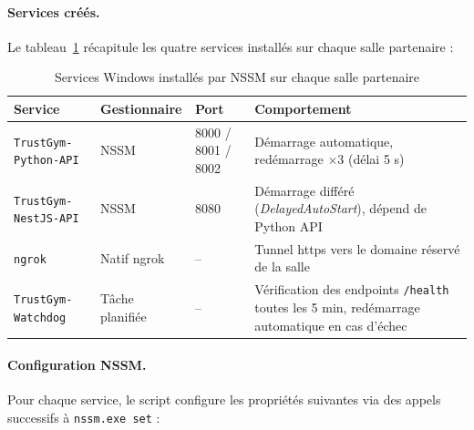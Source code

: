 ﻿\documentclass[../main.tex]{subfiles}
\begin{document}
\paragraph{Services cr\'{e}\'{e}s.}
Le tableau~\ref{tab:nssm_services} r\'{e}capitule les quatre services install\'{e}s sur chaque salle partenaire :

\begin{table}[H]
\centering
\small
\begin{tabular}{|p{4.5cm}|p{2cm}|p{2.5cm}|p{4.5cm}|}
\hline
\textbf{Service} & \textbf{Gestionnaire} & \textbf{Port} & \textbf{Comportement} \\
\hline
\texttt{TrustGym-Python-API} & NSSM & 8000 / 8001 / 8002 & D\'{e}marrage automatique, redémarrage $\times$3 (d\'{e}lai 5 s) \\
\hline
\texttt{TrustGym-NestJS-API} & NSSM & 8080 & D\'{e}marrage diff\'{e}r\'{e} (\textit{DelayedAutoStart}), d\'{e}pend de Python API \\
\hline
\texttt{ngrok} & Natif ngrok & -- & Tunnel \acrshort{https} vers le domaine r\'{e}serv\'{e} de la salle \\
\hline
\texttt{TrustGym-Watchdog} & T\^{a}che planifi\'{e}e & -- & V\'{e}rification des endpoints \texttt{/health} toutes les 5 min, red\'{e}marrage automatique en cas d'\'{e}chec \\
\hline
\end{tabular}
\caption{Services Windows install\'{e}s par NSSM sur chaque salle partenaire}
\label{tab:nssm_services}
\end{table}

\paragraph{Configuration NSSM.}
\begin{sloppypar}
Pour chaque service, le script configure les propri\'{e}t\'{e}s suivantes via des appels successifs \`{a} \texttt{nssm.exe set} :
\end{sloppypar}
\end{document}
